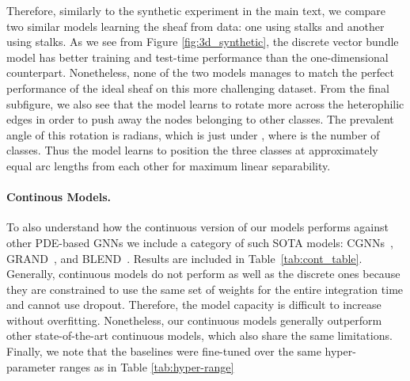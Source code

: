 \documentclass{article}
\begin{document}
Therefore, similarly to the synthetic experiment in the main text, we compare two similar models learning the sheaf from data: one using  stalks and another using  stalks. As we see from Figure \ref{fig:3d_synthetic}, the discrete vector bundle model has better training and test-time performance than the one-dimensional counterpart. Nonetheless, none of the two models manages to match the perfect performance of the ideal sheaf on this more challenging dataset. From the final subfigure, we also see that the model learns to rotate more across the heterophilic edges in order to push away the nodes belonging to other classes. The prevalent angle of this rotation is  radians, which is just under , where  is the number of classes. Thus the model learns to position the three classes at approximately equal arc lengths from each other for maximum linear separability.

\paragraph{Continous Models.} To also understand how the continuous version of our models performs against other PDE-based GNNs we include a category of such SOTA models:
CGNNs~\citep{xhonneux2020continuous}, GRAND~\citep{chamberlain2021grand}, and BLEND~\citep{chamberlain2021blend}. Results are included in Table~\ref{tab:cont_table}. Generally, continuous models do not perform as well as the discrete ones because they are constrained to use the same set of weights for the entire integration time and cannot use dropout. Therefore, the model capacity is difficult to increase without overfitting. Nonetheless, our continuous models generally outperform other state-of-the-art continuous models, which also share the same limitations. Finally, we note that the baselines were fine-tuned over the same hyper-parameter ranges as in Table \ref{tab:hyper-range}
\end{document}
